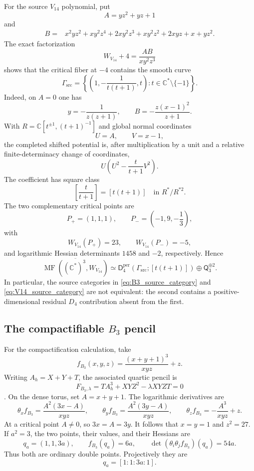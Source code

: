 \documentclass[11pt]{amsart}
\theoremstyle{definition}
\theoremstyle{remark}
\DeclareMathOperator{\MF}{MF}
\newcommand{\MorseCat}[1]{\mathsf{Q}_{#1}}
\newcommand{\Dper}[3]{\mathsf{D}^{\mathrm{per}}_{#2}(#1;[#3])}
\begin{document}
For the source $V_{14}$ polynomial, put
\[
A=yz^2+yz+1
\]
and
\[
\begin{aligned}
B={}&x^2yz^2+xy^2z^4+2xy^2z^3+xy^2z^2
     +2xyz+x+yz^2.
\end{aligned}
\]
The exact factorization
\begin{equation}
\label{eq:V14_source_factorization}
W_{V_{14}}+4=\frac{AB}{xy^2z^3}
\end{equation}
shows that the critical fiber at $-4$ contains the smooth curve
\[
\Gamma_{\mathrm{src}}
=
\left\{
\left(1,-\frac1{t(t+1)},t\right):
t\in\mathbb C^*\setminus\{-1\}
\right\}.
\]
Indeed, on $A=0$ one has
\[
y=-\frac1{z(z+1)},
\qquad
B=-\frac{z(x-1)^2}{z+1}.
\]
With $R=\mathbb C[t^{\pm1},(t+1)^{-1}]$ and global normal coordinates
\[
U=A,
\qquad
V=x-1,
\]
the completed shifted potential is, after multiplication by a unit and a
relative finite-determinacy change of coordinates,
\[
U\left(U^2-\frac{t}{t+1}V^2\right).
\]
The coefficient has square class
\[
\left[\frac{t}{t+1}\right]=[t(t+1)]
\quad\text{in }R^*/R^{*2}.
\]
The two complementary critical points are
\[
P_+=(1,1,1),
\qquad
P_-=\left(-1,9,-\frac13\right),
\]
with
\[
W_{V_{14}}(P_+)=23,
\qquad
W_{V_{14}}(P_-)=-5,
\]
and logarithmic Hessian determinants $1458$ and $-2$, respectively.  Hence
\begin{equation}
\label{eq:V14_source_category}
\overline{\MF((\mathbb C^*)^3,W_{V_{14}})}
\simeq
\Dper{\Gamma_{\mathrm{src}}}{4}{t(t+1)}
\oplus\MorseCat{3}^{\oplus2}.
\end{equation}
In particular, the source categories in
\eqref{eq:B3_source_category} and \eqref{eq:V14_source_category} are not
equivalent: the second contains a positive-dimensional residual $D_4$
contribution absent from the first.

\subsection{The compactifiable \texorpdfstring{$B_3$}{B3} pencil}

For the compactification calculation, take
\begin{equation}
\label{eq:B3_compact_torus}
f_{B_3}(x,y,z)=\frac{(x+y+1)^3}{xyz}+z.
\end{equation}
Writing $A_h=X+Y+T$, the associated quartic pencil is
\begin{equation}
\label{eq:B3_compact_pencil}
F_{B_3,\lambda}
=T A_h^3+XYZ^2-\lambda XYZT=0
\end{equation}
\cite{PrzyjalkowskiWeak,Przyjalkowski2026}.  On the dense torus, set
$A=x+y+1$.  The logarithmic derivatives are
\[
\theta_xf_{B_3}=\frac{A^2(3x-A)}{xyz},
\qquad
\theta_yf_{B_3}=\frac{A^2(3y-A)}{xyz},
\qquad
\theta_zf_{B_3}=-\frac{A^3}{xyz}+z.
\]
At a critical point $A\neq0$, so $3x=A=3y$.  It follows that $x=y=1$ and
$z^2=27$.  If $a^2=3$, the two points, their values, and their Hessians are
\begin{equation}
\label{eq:B3_compact_nodes}
q_a=(1,1,3a),
\qquad
f_{B_3}(q_a)=6a,
\qquad
\det(\theta_i\theta_jf_{B_3})(q_a)=54a.
\end{equation}
Thus both are ordinary double points.  Projectively they are
\[
q_a=[1:1:3a:1].
\]
\end{document}
